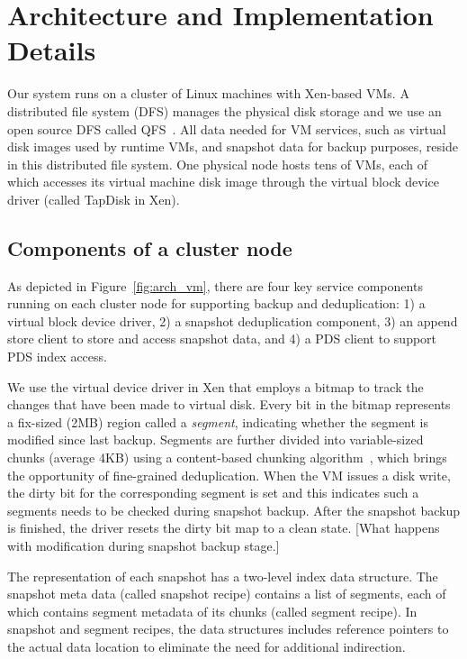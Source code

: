 \section{Architecture and Implementation Details}
\label{sect:architecture}
Our system runs on a cluster of Linux machines with Xen-based VMs.
A distributed file system (DFS) manages  the physical disk storage and we use 
an open source DFS called QFS~\cite{QFS}. 
All data needed for VM services, such as virtual disk images used by runtime VMs,
and snapshot data for backup purposes, reside in this distributed file system. 
One physical node hosts tens of VMs, each of which accesses its virtual machine disk image through the
virtual block device driver (called TapDisk\cite{Warfield2005} in Xen).

\subsection{ Components of a cluster node } 
As  depicted in Figure~\ref{fig:arch_vm}, 
there are four key service components running on each cluster
node  for supporting backup and deduplication: 
1) a virtual block device driver, 2) a snapshot deduplication component,
3) an append store client to store  and access snapshot data,
and 4)  a PDS client to support PDS index access. 

We use the virtual device driver in Xen that employs a bitmap to track the changes 
that have been made to virtual disk.
Every bit in the bitmap represents a fix-sized (2MB) region called a \textit{segment}, indicating whether the segment
is modified since last backup. 
Segments are further divided into variable-sized chunks (average 4KB) 
using a content-based chunking algorithm~\cite{frame05}, 
which brings the opportunity of fine-grained deduplication.
When the VM issues a disk write, the dirty bit for the corresponding segment is set
and this indicates such a segments needs to be checked during snapshot backup. 
After the snapshot backup is finished, the driver resets the dirty bit map to a clean state.
[What happens with modification during snapshot backup stage.]

The representation of each snapshot has  a two-level index data structure.
The snapshot meta data (called snapshot recipe) contains a list of segments, each of which contains segment
metadata of its chunks (called segment recipe).
In snapshot and segment recipes, 
the data structures  includes reference pointers to the actual data location to eliminate the need for additional indirection.

